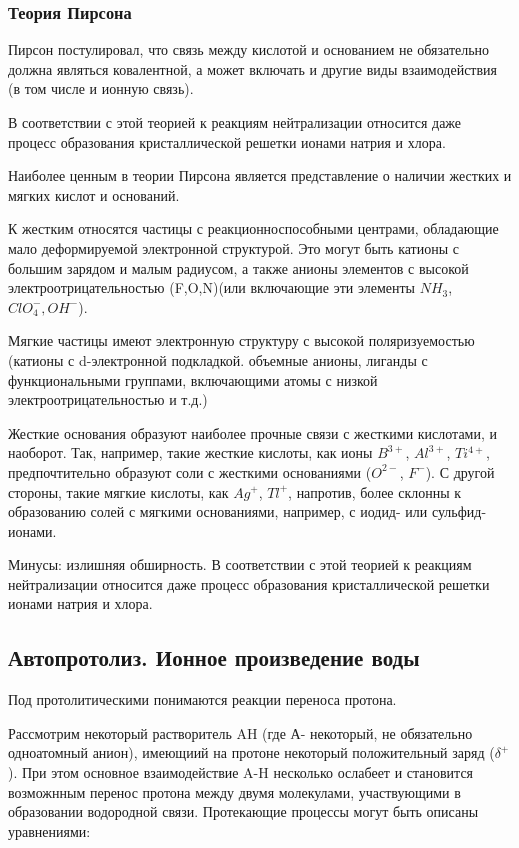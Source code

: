 \documentclass[14pt,a4paper]{scrartcl}
\begin{document}
\subsubsection*{Теория Пирсона}

Пирсон постулировал, что связь между кислотой и основанием не обязательно должна являться ковалентной, а может включать и другие виды взаимодействия (в том числе и ионную связь).

В соответствии с этой теорией к реакциям нейтрализации относится даже процесс образования кристаллической решетки ионами натрия и хлора.

Наиболее ценным в теории Пирсона является представление о наличии жестких и мягких кислот и оснований. 

К жестким относятся частицы с реакционноспособными центрами, обладающие мало деформируемой электронной структурой. Это могут быть катионы с большим зарядом и малым радиусом, а также анионы элементов с высокой электроотрицательностью (F,O,N)(или включающие эти элементы $NH_3$, $ClO_4^-, OH^-$).

Мягкие частицы имеют электронную структуру с высокой поляризуемостью (катионы с d-электронной подкладкой. объемные анионы, лиганды с функциональными группами, включающими атомы с низкой электроотрицательностью и т.д.)

Жесткие основания образуют наиболее прочные связи с жесткими кислотами, и наоборот. Так, например, такие жесткие кислоты, как ионы $B^{3+}$, $Al^{3+}$, $Ti^{4+}$, предпочтительно образуют соли с жесткими основаниями ($O^{2-}$, $F^-$). С другой стороны, такие мягкие кислоты, как $Ag^+$, $Tl^+$, напротив, более склонны к образованию солей с мягкими основаниями, например, с иодид- или сульфид-ионами.

Минусы: излишняя обширность. В соответствии с этой
теорией к реакциям нейтрализации относится
даже процесс образования кристаллической
решетки ионами натрия и хлора.

\subsection*{Автопротолиз. Ионное произведение воды}


Под протолитическими понимаются реакции переноса протона.

Рассмотрим некоторый растворитель AH (где А- некоторый, не обязательно одноатомный анион), имеющиий на протоне некоторый положительный заряд ($\delta^+$). При этом основное взаимодействие A-H несколько ослабеет и становится возможнным перенос протона между двумя молекулами, участвующими в образовании водородной связи. Протекающие процессы могут быть описаны уравнениями:
\end{document}
